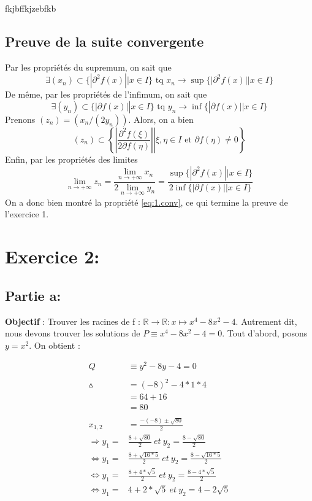fkjbffkjzebfkb\documentclass[a4paper, 12pt]{article}
\begin{document}
\subsection{Preuve de la suite convergente}

Par les propriétés du supremum, on sait que
$$
\exists (x_n) \subset \{ | \partial^2 f(x) || x \in I \} \text{ tq } x_n \to \sup \{ | \partial^2 f(x) || x \in I \}
$$
De même, par les propriétés de l'infimum, on sait que
$$
\exists (y_n) \subset \{ |\partial f(x)|| x \in I \} \text { tq } y_n \to \inf \{ |\partial f(x)|| x \in I \}
$$
Prenons \( (z_n) = (x_n/(2y_n)) \). Alors, on a bien
$$
(z_n) \subset
\left\{ \left. \left| \frac{\partial^2f(\xi)}{2\partial f(\eta)} \right| \right| \xi, \eta \in I \text{ et } \partial f(\eta) \neq 0 \right\}
$$
Enfin, par les propriétés des limites
$$
\lim_{n \to +\infty} z_n
= \frac{\lim_{n \to +\infty} x_n}{2 \lim_{n \to +\infty} y_n}
= \frac{\sup \{ | \partial^2 f(x) || x \in I \}}{2 \inf \{ |\partial f(x)|| x \in I \}}
$$
On a donc bien montré la propriété \eqref{eq:1.conv}, ce qui termine la preuve de l'exercice 1.

\newpage
\section{Exercice 2:}
\subsection{Partie a:}

\textbf{Objectif} : Trouver les racines de f : \( \mathbb{R} \rightarrow \mathbb{R} : x \mapsto x^4 - 8x^2 - 4 \).
Autrement dit, nous devons trouver les solutions de \( P \equiv x^4 - 8x^2 - 4 = 0 \). \newline
Tout d'abord, posons \( y = x^2 \).
On obtient : 

\begin{align*}
	Q &\equiv y^2 - 8y - 4 = 0\\ \\
	\vartriangle &= (-8)^2 - 4 * 1 * 4 \\
	       &= 64 + 16 \\
	       &= 80 \\ \\
   x_{1,2} &= \frac{-(-8) \pm \sqrt{80}}{2} \\
   \Rightarrow y_1 = &\frac{8 + \sqrt{80}}{2} ~ et ~ y_2 = \frac{8 - \sqrt{80}}{2} \\
   \Leftrightarrow y_1 = &\frac{8 + \sqrt{16 * 5}}{2} ~ et ~ y_2 = \frac{8 - \sqrt{16 * 5}}{2} \\
   \Leftrightarrow y_1 = &\frac{8 + 4 * \sqrt{5}}{2} ~ et ~ y_2 = \frac{8 - 4 * \sqrt{5}}{2} \\
    \Leftrightarrow y_1 = &4 + 2 * \sqrt{5} ~ et ~ y_2 = 4 - 2\sqrt{5}
\end{align*}
\end{document}
